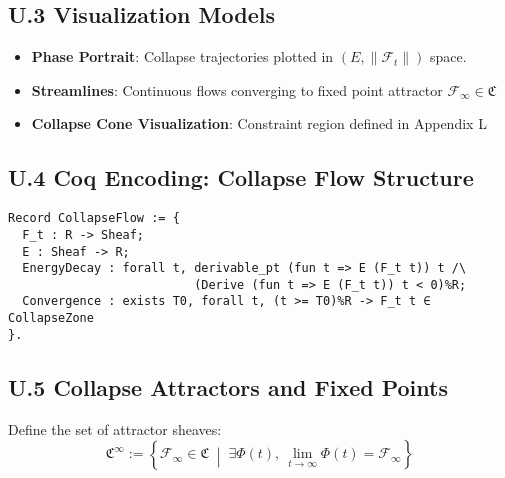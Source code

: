\documentclass[11pt]{article}
\begin{document}
\subsection*{U.3 Visualization Models}

\begin{itemize}
  \item \textbf{Phase Portrait}: \quad Collapse trajectories plotted in $(E, \|\mathcal{F}_t\|)$ space.
  \item \textbf{Streamlines}: \quad Continuous flows converging to fixed point attractor \( \mathcal{F}_\infty \in \mathfrak{C} \)
  \item \textbf{Collapse Cone Visualization}: \quad Constraint region defined in Appendix L
\end{itemize}

\begin{center}
\end{center}

\subsection*{U.4 Coq Encoding: Collapse Flow Structure}

\begin{lstlisting}[language=Coq, caption=Collapse Flow Definition, captionpos=b]
Record CollapseFlow := {
  F_t : R -> Sheaf;
  E : Sheaf -> R;
  EnergyDecay : forall t, derivable_pt (fun t => E (F_t t)) t /\
                          (Derive (fun t => E (F_t t)) t < 0)%R;
  Convergence : exists T0, forall t, (t >= T0)%R -> F_t t ∈ CollapseZone
}.
\end{lstlisting}

\subsection*{U.5 Collapse Attractors and Fixed Points}

Define the set of attractor sheaves:
\[
\mathfrak{C}^{\infty} := \left\{ \mathcal{F}_\infty \in \mathfrak{C} \;\middle|\; \exists \Phi(t),\ \lim_{t \to \infty} \Phi(t) = \mathcal{F}_\infty \right\}
\]
\end{document}

